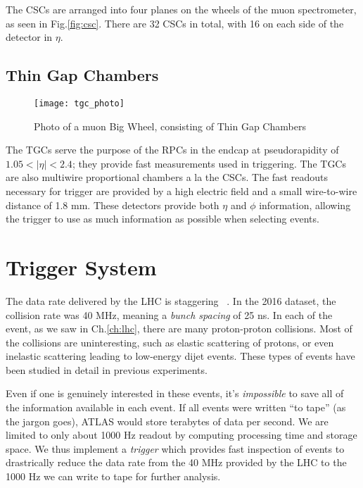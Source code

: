 The CSCs are arranged into four planes on the wheels of the muon spectrometer, as seen in Fig.\ref{fig:csc}.
There are 32 CSCs in total, with 16 on each side of the detector in $\eta.$

\subsection{Thin Gap Chambers}
\begin{figure}
\caption{Photo of a muon Big Wheel, consisting of Thin Gap Chambers} \label{fig:tgc_photo}
\texttt{[image: tgc\_photo]}
\end{figure}

The TGCs serve the purpose of the RPCs in the endcap at pseudorapidity of $1.05 < |\eta| < 2.4 $; they provide fast measurements used in triggering.
The TGCs are also multiwire proportional chambers a la the CSCs.
The fast readouts necessary for trigger are provided by a high electric field and a small wire-to-wire distance of 1.8 mm.
These detectors provide both $\eta$ and $\phi$ information, allowing the trigger to use as much information as possible when selecting events.

\section{Trigger System}\label{sec:trigger}

The data rate delivered by the LHC is staggering ~\cite{ATL-DAQ-PUB-2016-001}.
In the 2016 dataset, the collision rate was 40 MHz, meaning a \textit{bunch spacing} of 25 ns.
In each of the event, as we saw in Ch.\ref{ch:lhc}, there are many proton-proton collisions.
Most of the collisions are uninteresting, such as elastic scattering of protons, or even inelastic scattering leading to low-energy dijet events.
These types of events have been studied in detail in previous experiments.

Even if one is genuinely interested in these events, it's \textit{impossible} to save all of the information available in each event.
If all events were written ``to tape'' (as the jargon goes), ATLAS would store terabytes of data per second.
We are limited to only about 1000 Hz readout by computing processing time and storage space.
We thus implement a \textit{trigger} which provides fast inspection of events to drastrically reduce the data rate from the 40 MHz provided by the LHC to the 1000 Hz we can write to tape for further analysis.

